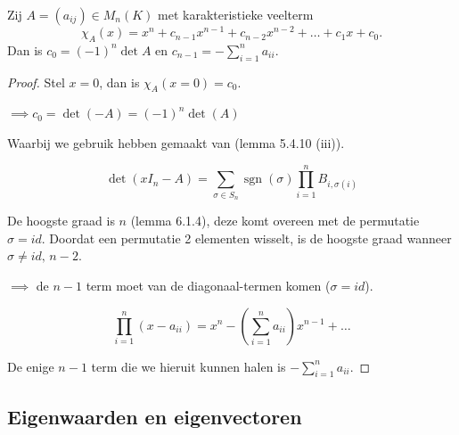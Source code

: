 \begin{lemma}[6.1.6]
    Zij $A = (a_{ij}) \in M_n(K)$ met karakteristieke veelterm
    \[ \chi_A(x) = x^n + c_{n-1}x^{n-1} + c_{n-2}x^{n-2} + \dots + c_1x + c_0. \]
    Dan is $c_0 = (-1)^n \det A$ en $c_{n-1} = -\sum_{i=1}^n a_{ii}$.
\end{lemma}
\begin{proof}
    Stel \(x = 0\), dan is \(\chi_A(x=0) = c_0\).

    \(\implies c_0 = \det(-A) = (-1)^n \det(A)\)

    Waarbij we gebruik hebben gemaakt van (lemma 5.4.10 (iii)).



    $$\det(xI_n - A) = \sum_{\sigma \in S_n} \operatorname{sgn}(\sigma) \prod_{i=1}^n B_{i, \sigma(i)} $$

    De hoogste graad is \(n\) (lemma 6.1.4), deze komt overeen met de permutatie \(\sigma = id\).
    Doordat een permutatie 2 elementen wisselt, is de hoogste graad wanneer \(\sigma \neq id, \, n-2\).

    \(\implies\) de \(n-1\) term moet van de diagonaal-termen komen (\(\sigma = id\)).

    \[\prod_{i=1}^n (x - a_{ii}) = x^n - \left(\sum_{i=1}^n a_{ii}\right)x^{n-1} + \dots\]

    De enige \(n-1\) term die we hieruit kunnen halen is \(-\sum_{i=1}^{n} a_{ii}\).


\end{proof}

\subsection{Eigenwaarden en eigenvectoren}

